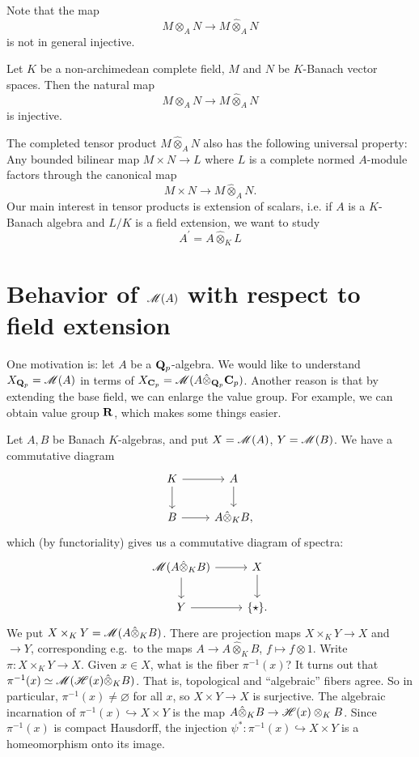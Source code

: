 Note that the map
\[
M\otimes_A N\to M\hat{\otimes}_AN
\]
is not in general injective.
\begin{theorem}[Gruson] Let $K$ be a non-archimedean complete field, $M$ and $N$ be $K$-Banach vector spaces. Then the natural map 
\[
  M\otimes_A N\to M\hat{\otimes}_AN
\]
is injective.
\end{theorem}
The completed tensor product $M\hat{\otimes}_AN$ also has the following universal property: Any bounded bilinear map $M\times N\to L$ where $L$ is a complete normed $A$-module factors through the canonical map
\[
M\times N\to M\hat{\otimes}_A N.
\]
Our main interest in tensor products is extension of scalars, i.e. if $A$ is a $K$-Banach algebra and $L/K$ is a field extension, we want to study
\[
A^\prime=A\hat{\otimes}_K L
\]





\section{Behavior of \texorpdfstring{$\operatorname{\mathscr{M}}(A)$}{M(A)} with respect to field extension}

One motivation is: let $A$ be a $\mathbf{Q}_p$-algebra. We would like to understand 
$X_{\mathbf{Q}_p}=\operatorname{\mathscr{M}}(A)$ in terms of 
$X_{\mathbf{C}_p} = \operatorname{\mathscr{M}}(A\hat\otimes_{\mathbf{Q}_p}\mathbf{C}_p)$. Another reason is that by 
extending the base field, we can enlarge the value group. For example, we can 
obtain value group $\mathbf{R}$, which makes some things easier. 

Let $A,B$ be Banach $K$-algebras, and put $X=\operatorname{\mathscr{M}}(A)$, $Y=\operatorname{\mathscr{M}}(B)$. 
We have a commutative diagram 
\[
\begin{tikzcd}
	K \ar[r] \ar[d]
		& A \ar[d] \\
	B \ar[r]
		& A\hat\otimes_K B ,
\end{tikzcd}
\]
which (by functoriality) gives us a commutative diagram of spectra:
\[
\begin{tikzcd}
	\Berkspec(A\hat\otimes_K B) \ar[r] \ar[d]
		& X \ar[d] \\
	Y \ar[r]
		& \{\ast\} .
\end{tikzcd}
\]
We put $X\times_K Y = \operatorname{\mathscr{M}}(A\hat\otimes_K B)$. There are projection maps 
$X\times_K Y\to X$ and $\to Y$, corresponding e.g.~to the maps 
$A\to A\hat\otimes_K B$, $f\mapsto f\otimes 1$. Write 
$\pi\colon X\times_K Y\to X$. Given $x\in X$, what is the fiber $\pi^{-1}(x)$? 
It turns out that $\pi^{-1}(x)\simeq\operatorname{\mathscr{M}}(\mathscr{H}(x)\hat\otimes_K B)$. That is, 
topological and ``algebraic'' fibers agree. So in particular, 
$\pi^{-1}(x)\ne\varnothing$ for all $x$, so $X\times Y\to X$ is surjective. The 
algebraic incarnation of $\pi^{-1}(x)\hookrightarrow X\times Y$ is the map 
$A\hat\otimes_K B\to \mathscr{H}(x)\otimes_K B$. Since $\pi^{-1}(x)$ is compact 
Hausdorff, the injection $\psi^\ast\colon\pi^{-1}(x)\hookrightarrow X\times Y$ 
is a homeomorphism onto its image. 


